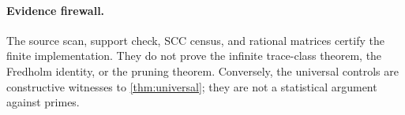 \paragraph{Evidence firewall.}
The source scan, support check, SCC census, and rational matrices certify the
finite implementation.  They do not prove the infinite trace-class theorem,
the Fredholm identity, or the pruning theorem.  Conversely, the universal
controls are constructive witnesses to \cref{thm:universal}; they are not a
statistical argument against primes.
